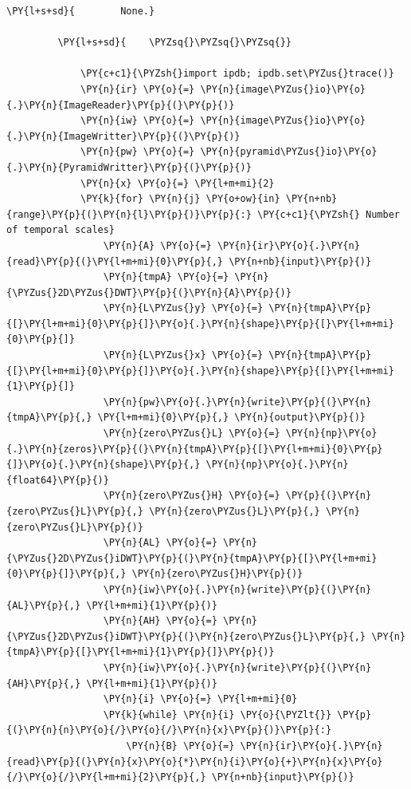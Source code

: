{\begin{Verbatim}[commandchars=\\\{\}]
         \PY{l+s+sd}{        None.}
         
         \PY{l+s+sd}{    \PYZsq{}\PYZsq{}\PYZsq{}}
             
             \PY{c+c1}{\PYZsh{}import ipdb; ipdb.set\PYZus{}trace()}
             \PY{n}{ir} \PY{o}{=} \PY{n}{image\PYZus{}io}\PY{o}{.}\PY{n}{ImageReader}\PY{p}{(}\PY{p}{)}
             \PY{n}{iw} \PY{o}{=} \PY{n}{image\PYZus{}io}\PY{o}{.}\PY{n}{ImageWritter}\PY{p}{(}\PY{p}{)}
             \PY{n}{pw} \PY{o}{=} \PY{n}{pyramid\PYZus{}io}\PY{o}{.}\PY{n}{PyramidWritter}\PY{p}{(}\PY{p}{)}
             \PY{n}{x} \PY{o}{=} \PY{l+m+mi}{2}
             \PY{k}{for} \PY{n}{j} \PY{o+ow}{in} \PY{n+nb}{range}\PY{p}{(}\PY{n}{l}\PY{p}{)}\PY{p}{:} \PY{c+c1}{\PYZsh{} Number of temporal scales}
                 \PY{n}{A} \PY{o}{=} \PY{n}{ir}\PY{o}{.}\PY{n}{read}\PY{p}{(}\PY{l+m+mi}{0}\PY{p}{,} \PY{n+nb}{input}\PY{p}{)}
                 \PY{n}{tmpA} \PY{o}{=} \PY{n}{\PYZus{}2D\PYZus{}DWT}\PY{p}{(}\PY{n}{A}\PY{p}{)}
                 \PY{n}{L\PYZus{}y} \PY{o}{=} \PY{n}{tmpA}\PY{p}{[}\PY{l+m+mi}{0}\PY{p}{]}\PY{o}{.}\PY{n}{shape}\PY{p}{[}\PY{l+m+mi}{0}\PY{p}{]}
                 \PY{n}{L\PYZus{}x} \PY{o}{=} \PY{n}{tmpA}\PY{p}{[}\PY{l+m+mi}{0}\PY{p}{]}\PY{o}{.}\PY{n}{shape}\PY{p}{[}\PY{l+m+mi}{1}\PY{p}{]}
                 \PY{n}{pw}\PY{o}{.}\PY{n}{write}\PY{p}{(}\PY{n}{tmpA}\PY{p}{,} \PY{l+m+mi}{0}\PY{p}{,} \PY{n}{output}\PY{p}{)}        
                 \PY{n}{zero\PYZus{}L} \PY{o}{=} \PY{n}{np}\PY{o}{.}\PY{n}{zeros}\PY{p}{(}\PY{n}{tmpA}\PY{p}{[}\PY{l+m+mi}{0}\PY{p}{]}\PY{o}{.}\PY{n}{shape}\PY{p}{,} \PY{n}{np}\PY{o}{.}\PY{n}{float64}\PY{p}{)}
                 \PY{n}{zero\PYZus{}H} \PY{o}{=} \PY{p}{(}\PY{n}{zero\PYZus{}L}\PY{p}{,} \PY{n}{zero\PYZus{}L}\PY{p}{,} \PY{n}{zero\PYZus{}L}\PY{p}{)}
                 \PY{n}{AL} \PY{o}{=} \PY{n}{\PYZus{}2D\PYZus{}iDWT}\PY{p}{(}\PY{n}{tmpA}\PY{p}{[}\PY{l+m+mi}{0}\PY{p}{]}\PY{p}{,} \PY{n}{zero\PYZus{}H}\PY{p}{)}
                 \PY{n}{iw}\PY{o}{.}\PY{n}{write}\PY{p}{(}\PY{n}{AL}\PY{p}{,} \PY{l+m+mi}{1}\PY{p}{)}
                 \PY{n}{AH} \PY{o}{=} \PY{n}{\PYZus{}2D\PYZus{}iDWT}\PY{p}{(}\PY{n}{zero\PYZus{}L}\PY{p}{,} \PY{n}{tmpA}\PY{p}{[}\PY{l+m+mi}{1}\PY{p}{]}\PY{p}{)}
                 \PY{n}{iw}\PY{o}{.}\PY{n}{write}\PY{p}{(}\PY{n}{AH}\PY{p}{,} \PY{l+m+mi}{1}\PY{p}{)}
                 \PY{n}{i} \PY{o}{=} \PY{l+m+mi}{0}
                 \PY{k}{while} \PY{n}{i} \PY{o}{\PYZlt{}} \PY{p}{(}\PY{n}{n}\PY{o}{/}\PY{o}{/}\PY{n}{x}\PY{p}{)}\PY{p}{:}
                     \PY{n}{B} \PY{o}{=} \PY{n}{ir}\PY{o}{.}\PY{n}{read}\PY{p}{(}\PY{n}{x}\PY{o}{*}\PY{n}{i}\PY{o}{+}\PY{n}{x}\PY{o}{/}\PY{o}{/}\PY{l+m+mi}{2}\PY{p}{,} \PY{n+nb}{input}\PY{p}{)}

\end{Verbatim}}
